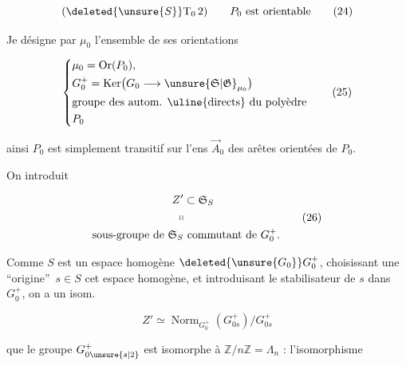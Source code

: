 
\[
(\deleted{\unsure{S}}\mathrm T_0\,2)\qquad P_0\text{ est orientable}\tag*{(24)}
\]


Je désigne par $\mu_0$ l'ensemble de ses orientations

\[
\left\{\begin{aligned}
 &\mu_0=\operatorname{Or}(P_0),\\
 &G_0^+=\operatorname{Ker}\bigl(G_0\longrightarrow\unsure{\mathfrak S|\mathfrak G}_{\mu_0}\bigr)\\
 &\text{groupe des autom. \uline{directs} du polyèdre}\\
 &P_0
\end{aligned}\right.\tag*{(25)}
\]

ainsi $P_0$ est simplement transitif sur l'ens $\vec A_0$ des arêtes orientées de $P_0$.

On introduit

\[
\begin{aligned}
 Z'&\subset\mathfrak S_S\\
 \shortparallel&\\
 \text{sous-groupe de }\mathfrak S_S&\text{ commutant de }G_0^+.
\end{aligned}\tag*{(26)}
\]


Comme $S$ est un espace homogène  $\deleted{\unsure{G_0}}G_0^+$, choisissant une ``origine''\ $s\in S$  cet espace homogène, et introduisant le stabilisateur de $s$ dans $G_0^+$, on a un isom.

\[
Z'\simeq\operatorname{Norm}_{G_0^+}(G_{0s}^+)/G_{0s}^+\tag*{(27)}
\]

 que  le groupe $G_{0\unsure{s|2}}^+$ est isomorphe à $\mathbb Z/n\mathbb Z=\Lambda_n$  : l'isomorphisme
